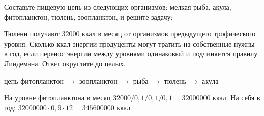 
Составьте
пищевую цепь из следующих организмов: мелкая рыба, акула, фитопланктон, тюлень,
зоопланктон, и решите задачу:

Тюлени
получают 32000 ккал в месяц от организмов предыдущего трофического уровня.
Сколько ккал энергии продуценты могут тратить на собственные нужны в год, если
перенос энергии между уровнями одинаковый и подчиняется правилу Линдемана.
Ответ округлите до целых.

\solutionSection

цепь фитопланктон $\rightarrow$ зоопланктон $\rightarrow$ рыба $\rightarrow$ тюлень $\rightarrow$ акула

На уровне фитопланктона в месяц $32000/0,1/0,1/0,1=32000000$ ккал. 
На себя в год: $32000000 \cdot 0,9 \cdot 12=345 600 000$ ккал

